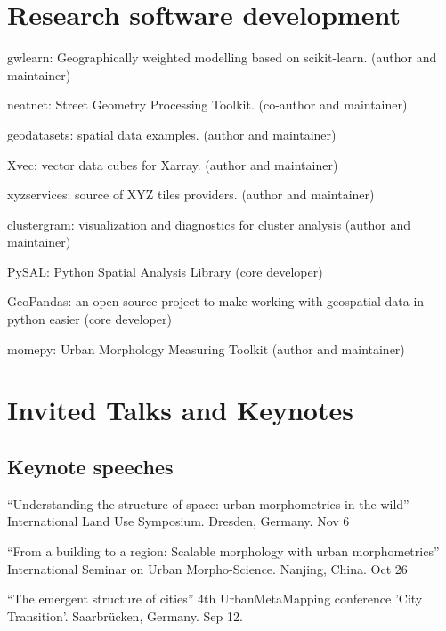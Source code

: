 \documentclass[12pt,a4paper]{report}
\begin{document}
    \section*{Research software development}

    \begin{tablist}

        \item[2026--] \tab{}gwlearn: Geographically weighted modelling based on scikit-learn. (author and maintainer)
        \item[2025--] \tab{}neatnet: Street Geometry Processing Toolkit. (co-author and maintainer)
        \item[2023--] \tab{}geodatasets: spatial data examples. (author and maintainer)
        \item[2022--] \tab{}Xvec: vector data cubes for Xarray. (author and maintainer)
        \item[2021--] \tab{}xyzservices: source of XYZ tiles providers. (author and maintainer)
        \item[2020--] \tab{}clustergram: visualization and diagnostics for cluster analysis (author and maintainer)
        \item[2020--] \tab{}PySAL: Python Spatial Analysis Library (core developer)
        \item[2019--] \tab{}GeoPandas: an open source project to make working with geospatial data in python easier (core developer)
        \item[2018--] \tab{}momepy: Urban Morphology Measuring Toolkit (author and maintainer)

    \end{tablist}

    \section*{Invited Talks and Keynotes}

    \subsection*{Keynote speeches}

    \begin{tablist}

        \item[2025] \tab{}\enquote{Understanding the structure of space: urban morphometrics in the wild} International Land Use Symposium. Dresden, Germany. Nov 6
        \item[2024] \tab{}\enquote{From a building to a region: Scalable morphology with urban morphometrics} International Seminar on Urban Morpho-Science. Nanjing, China. Oct 26
        \item[2024] \tab{}\enquote{The emergent structure of cities} 4th UrbanMetaMapping conference 'City Transition'. Saarbrücken, Germany. Sep 12.

    \end{tablist}
\end{document}
